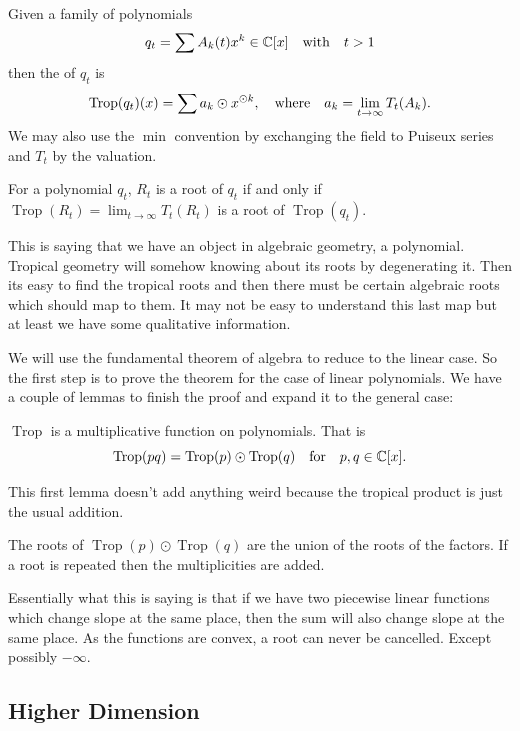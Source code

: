 \documentclass[12pt]{memoir}
\DeclareMathOperator{\Trop}{Trop}
\theoremstyle{definition}
\begin{document}
\begin{Def}
    Given a family of polynomials 
    $$q_t=\sum A_k(t)x^k\in\mathbb{C}[x]\quad\text{with}\quad t>1$$
    then the  of $q_t$ is 
    $$\Trop(q_t)(x)=\sum a_k\odot x^{\odot k},\word{where}a_k=\lim_{t\to\infty}T_t(A_k).$$
    We may also use the $\min$ convention by exchanging the field to Puiseux series and $T_t$ by the valuation.
\end{Def}

\begin{Th}[Correspondence]
For a polynomial $q_t$, $R_t$ is a root of $q_t$ if and only if $\Trop(R_t)=\lim_{t\to\infty}T_t(R_t)$ is a root of $\Trop(q_t)$.
\end{Th}

This is saying that we have an object in algebraic geometry, a polynomial. Tropical geometry will somehow knowing about its roots by degenerating it. Then its easy to find the tropical roots and then there must be certain algebraic roots which should map to them. It may not be easy to understand this last map but at least we have some qualitative information.\par 
We will use the fundamental theorem of algebra to reduce to the linear case. So the first step is to prove the theorem for the case of linear polynomials. We have a couple of lemmas to finish the proof and expand it to the general case:

\begin{Lem}
    $\Trop$ is a multiplicative function on polynomials. That is
    $$\Trop(pq)=\Trop(p)\odot\Trop(q)\word{for}p,q\in\bC[x].$$
    \end{Lem}
    
This first lemma doesn't add anything weird because the tropical product is just the usual addition.

    \begin{Lem}
    The roots of $\Trop(p)\odot\Trop(q)$ are the union of the roots of the factors. If a root is repeated then the multiplicities are added.
    \end{Lem}

    Essentially what this is saying is that if we have two piecewise linear functions which change slope at the same place, then the sum will also change slope at the same place. As the functions are convex, a root can never be cancelled. Except possibly $-\infty$.

    \subsection{Higher Dimension}
\end{document}
